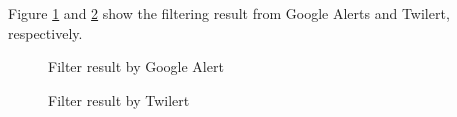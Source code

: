 \documentclass[letterpaper,11pt]{article}
\begin{document}
Figure \ref{fig:10_6_google_alerts_result} and \ref{fig:10_6_twilert_output} show the filtering result from Google Alerts and Twilert, respectively. 

\begin{figure}[H]
	\centering
	\caption{Filter result by Google Alert}
	\label{fig:10_6_google_alerts_result}
\end{figure}

\begin{figure}[H]
	\centering
	\caption{Filter result by Twilert}
	\label{fig:10_6_twilert_output}
\end{figure}
\end{document}
